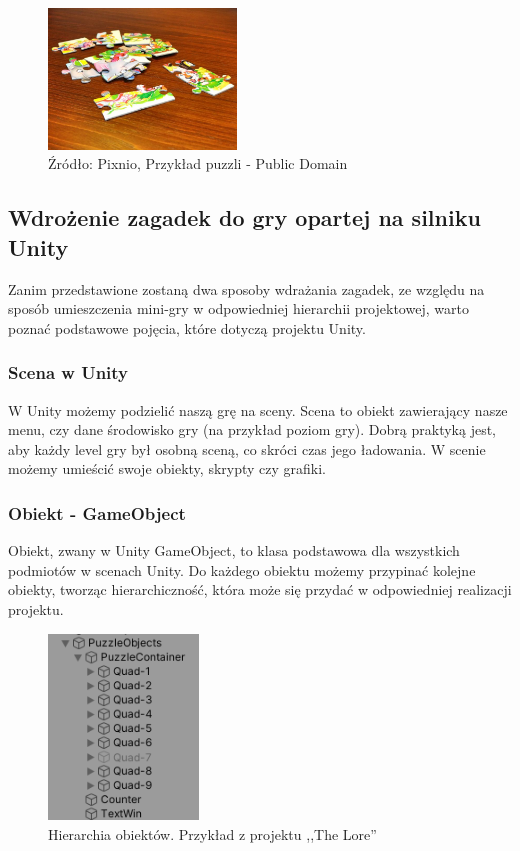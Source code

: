 \documentclass[oneside,polski,logo]{amuthesis}
\begin{document}
\begin{figure}[h]
	\centering
	\includegraphics[width=5cm]{images/tyrek/puzzle.jpg}
	\caption{Źródło: Pixnio, Przykład puzzli - Public Domain}
\end{figure}

\subsection{Wdrożenie zagadek do gry opartej na silniku Unity}
\par Zanim przedstawione zostaną dwa sposoby wdrażania zagadek, ze względu na sposób umieszczenia mini-gry w odpowiedniej hierarchii projektowej, warto poznać podstawowe pojęcia, które dotyczą projektu Unity.
\subsubsection{Scena w Unity}
\par W Unity możemy podzielić naszą grę na sceny. Scena to obiekt zawierający nasze menu, czy dane środowisko gry (na przykład poziom gry). Dobrą praktyką jest, aby każdy level gry był osobną sceną, co skróci czas jego ładowania. W scenie możemy umieścić swoje obiekty, skrypty czy grafiki. \cite{scena}
\subsubsection{Obiekt - GameObject}
\label{sec:gameobject}
\par Obiekt, zwany w Unity GameObject, to klasa podstawowa dla wszystkich podmiotów w scenach Unity. Do każdego obiektu możemy przypinać kolejne obiekty, tworząc hierarchiczność, która może się przydać w odpowiedniej realizacji projektu. \cite{gameobject}
\begin{figure}[h]
	\centering
	\includegraphics[width=4cm]{images/tyrek/hierarchia.png}
	\caption{Hierarchia obiektów. Przykład z projektu ,,The Lore''}
\end{figure}
\end{document}

